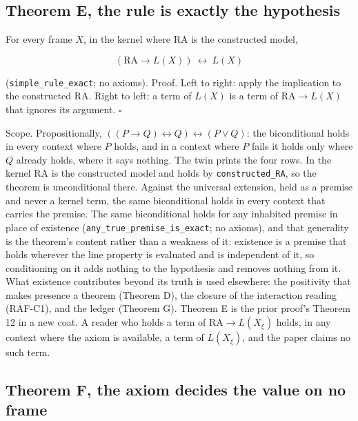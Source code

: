 \documentclass[10pt,twocolumn]{article}
\begin{document}
\hypertarget{theorem-e-the-rule-is-exactly-the-hypothesis}{%
\subsection{Theorem E, the rule is exactly the
hypothesis}\label{theorem-e-the-rule-is-exactly-the-hypothesis}}

For every frame \(X\), in the kernel where \(\mathrm{RA}\) is the
constructed model,

\[(\mathrm{RA} \to L(X)) \ \leftrightarrow\ L(X)\]

(\texttt{simple\_\allowbreak rule\_\allowbreak exact}; no axioms).
Proof. Left to right: apply the implication to the constructed
\(\mathrm{RA}\). Right to left: a term of \(L(X)\) is a term of
\(\mathrm{RA} \to L(X)\) that ignores its argument. \(\square\)

Scope. Propositionally,
\(((P \to Q) \leftrightarrow Q) \leftrightarrow (P \vee Q)\): the
biconditional holds in every context where \(P\) holds, and in a context
where \(P\) fails it holds only where \(Q\) already holds, where it says
nothing. The twin prints the four rows. In the kernel \(\mathrm{RA}\) is
the constructed model and holds by \texttt{constructed\_\allowbreak RA},
so the theorem is unconditional there. Against the universal extension,
held as a premise and never a kernel term, the same biconditional holds
in every context that carries the premise. The same biconditional holds
for any inhabited premise in place of existence
(\texttt{any\_\allowbreak true\_\allowbreak premise\_\allowbreak is\_\allowbreak exact};
no axioms), and that generality is the theorem's content rather than a
weakness of it: existence is a premise that holds wherever the line
property is evaluated and is independent of it, so conditioning on it
adds nothing to the hypothesis and removes nothing from it. What
existence contributes beyond its truth is used elsewhere: the positivity
that makes presence a theorem (Theorem D), the closure of the
interaction reading (RAF-C1), and the ledger (Theorem G). Theorem E is
the prior proof's Theorem 12 in a new coat. A reader who holds a term of
\(\mathrm{RA} \to L(X_\xi)\) holds, in any context where the axiom is
available, a term of \(L(X_\xi)\), and the paper claims no such term.

\hypertarget{theorem-f-the-axiom-decides-the-value-on-no-frame}{%
\subsection{Theorem F, the axiom decides the value on no
frame}\label{theorem-f-the-axiom-decides-the-value-on-no-frame}}
\end{document}
